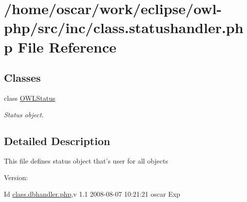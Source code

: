 \hypertarget{class_8statushandler_8php}{
\section{/home/oscar/work/eclipse/owl-php/src/inc/class.statushandler.php File Reference}
\label{class_8statushandler_8php}
}
\subsection*{Classes}
\begin{CompactItemize}
\item 
class \hyperlink{classOWLStatus}{OWLStatus}
\begin{CompactList}\small\item\em Status object. \item\end{CompactList}\end{CompactItemize}


\subsection{Detailed Description}
This file defines status object that's user for all objects \begin{Desc}
\item[Version:]\end{Desc}
\begin{Desc}
\item[Id]\hyperlink{class_8dbhandler_8php}{class.dbhandler.php},v 1.1 2008-08-07 10:21:21 oscar Exp \end{Desc}
